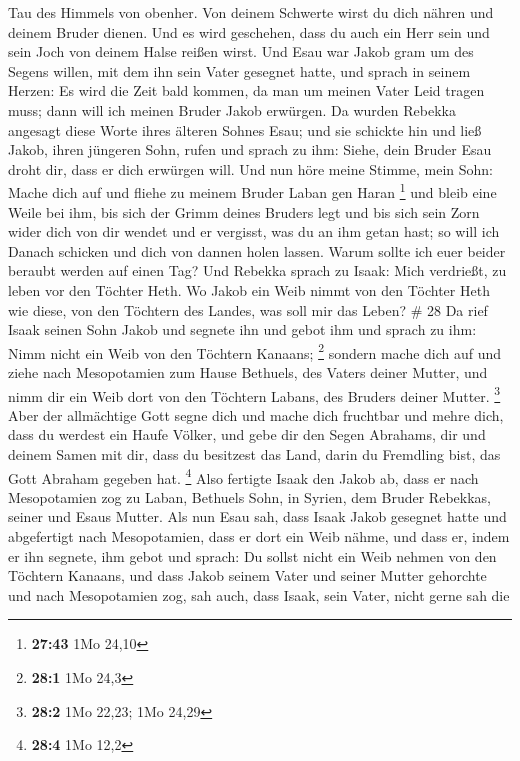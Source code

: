 Tau des Himmels von obenher.  Von deinem Schwerte wirst
du dich nähren und deinem Bruder dienen. Und es wird geschehen, dass du
auch ein Herr sein und sein Joch von deinem Halse reißen wirst.
 Und Esau war Jakob gram um des Segens willen, mit dem
ihn sein Vater gesegnet hatte, und sprach in seinem Herzen: Es wird die
Zeit bald kommen, da man um meinen Vater Leid tragen muss; dann will ich
meinen Bruder Jakob erwürgen.  Da wurden Rebekka angesagt
diese Worte ihres älteren Sohnes Esau; und sie schickte hin und ließ
Jakob, ihren jüngeren Sohn, rufen und sprach zu ihm: Siehe, dein Bruder
Esau droht dir, dass er dich erwürgen will.  Und nun höre
meine Stimme, mein Sohn: Mache dich auf und fliehe zu meinem Bruder
Laban gen Haran \footnote{\textbf{27:43} 1Mo 24,10}  und
bleib eine Weile bei ihm, bis sich der Grimm deines Bruders legt
 und bis sich sein Zorn wider dich von dir wendet und er
vergisst, was du an ihm getan hast; so will ich Danach schicken und dich
von dannen holen lassen. Warum sollte ich euer beider beraubt werden auf
einen Tag?  Und Rebekka sprach zu Isaak: Mich verdrießt,
zu leben vor den Töchter Heth. Wo Jakob ein Weib nimmt von den Töchter
Heth wie diese, von den Töchtern des Landes, was soll mir das Leben? \#
28  Da rief Isaak seinen Sohn Jakob und segnete ihn und
gebot ihm und sprach zu ihm: Nimm nicht ein Weib von den Töchtern
Kanaans; \footnote{\textbf{28:1} 1Mo 24,3}  sondern mache
dich auf und ziehe nach Mesopotamien zum Hause Bethuels, des Vaters
deiner Mutter, und nimm dir ein Weib dort von den Töchtern Labans, des
Bruders deiner Mutter. \footnote{\textbf{28:2} 1Mo 22,23; 1Mo 24,29}
 Aber der allmächtige Gott segne dich und mache dich
fruchtbar und mehre dich, dass du werdest ein Haufe Völker,
 und gebe dir den Segen Abrahams, dir und deinem Samen mit
dir, dass du besitzest das Land, darin du Fremdling bist, das Gott
Abraham gegeben hat. \footnote{\textbf{28:4} 1Mo 12,2} 
Also fertigte Isaak den Jakob ab, dass er nach Mesopotamien zog zu
Laban, Bethuels Sohn, in Syrien, dem Bruder Rebekkas, seiner und Esaus
Mutter.  Als nun Esau sah, dass Isaak Jakob gesegnet hatte
und abgefertigt nach Mesopotamien, dass er dort ein Weib nähme, und dass
er, indem er ihn segnete, ihm gebot und sprach: Du sollst nicht ein Weib
nehmen von den Töchtern Kanaans,  und dass Jakob seinem
Vater und seiner Mutter gehorchte und nach Mesopotamien zog,
 sah auch, dass Isaak, sein Vater, nicht gerne sah die
